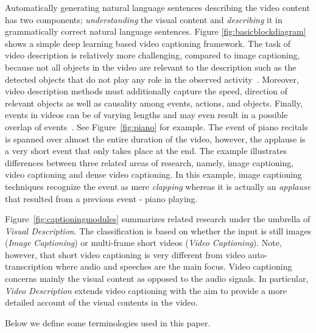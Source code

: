 \documentclass[10pt,journal,compsoc]{IEEEtran}
\begin{document}
Automatically generating natural language sentences describing the video content has two components; \emph{understanding} the visual content and \emph{describing} it in grammatically correct natural language sentences. Figure \ref{fig:basicblockdiagram} shows a simple deep learning based video captioning framework. The task of video description is relatively more challenging, compared to image captioning, because not all objects in the video are relevant to the description such as the detected objects that do not play any role in the observed activity~\cite{barbu2012video}. Moreover, video description methods must additionally capture the speed, direction of relevant objects as well as causality among events, actions, and objects. Finally, events in videos can be of varying lengths and may even result in a possible overlap of events~\cite{krishna2017dense}. See Figure~\ref{fig:piano} for example. The event of piano recitals is spanned over almost the entire duration of the video, however, the applause is a very short event that only takes place at the end. The example illustrates differences between three related areas of research, namely, image captioning, video captioning and dense video captioning. In this example, image captioning techniques recognize the event as mere \textit{clapping} whereas it is actually an \textit{applause} that resulted from a previous event - piano playing.

Figure~\ref{fig:captioningmodules} summarizes related research under the umbrella of \textit{Visual Description}. The classification is based on whether the input is still images (\textit{Image Captioning}) or multi-frame short videos (\textit{Video Captioning}). Note, however, that short video captioning is very different from video auto-transcription where audio and speeches are the main focus. Video captioning concerns mainly the visual content as opposed to the audio signals. In particular, \textit{Video Description} extends video captioning with the aim to provide a more detailed account of the visual contents in the video. 

Below we define some terminologies used in this paper.
\end{document}
